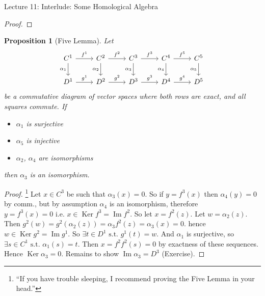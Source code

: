 \documentclass[10pt]{article}
\theoremstyle{plain}
\newtheorem{prop}[thm]{Proposition}
\theoremstyle{definition}
\newcommand{\st}{\text{ s.t. }}
\newcommand{\ie}{\text{ i.e. }}
\DeclareMathOperator{\Ker}{Ker}
\DeclareMathOperator{\Ima}{Im}
\begin{document}
\begin{section}{Lecture 11: Interlude: Some Homological Algebra}
\begin{proof}
\end{proof}
\begin{prop}[Five Lemma]\label{prop:fivelemma} Let
$$%
\begin{tikzcd}
C^1 \arrow[r, "f^1"] \arrow[d, "\alpha_1"'] & C^2 \arrow[r, "f^2"] \arrow[d, "\alpha_2"'] & C^3 \arrow[r, "f^3"] \arrow[d, "\alpha_3"'] & C^4 \arrow[r, "f^5"] \arrow[d, "\alpha_4"'] & C^5 \arrow[d, "\alpha_5"'] \\
D^1 \arrow[r, "g^1"]                        & D^2 \arrow[r, "g^2"]                        & D^3 \arrow[r, "g^3"]                        & D^4 \arrow[r, "g^4"]                        & D^5                       
\end{tikzcd}$$
be a commutative diagram of vector spaces where both rows are exact, and all squares commute. If 
\begin{itemize}
    \item $\alpha_1$ is surjective
    \item $\alpha_5$ is injective
    \item $\alpha_2$, $\alpha_4$ are isomorphisms
\end{itemize} then $\alpha_3$ is an isomorphism.
\end{prop}
\begin{proof}\footnote{``If you have trouble sleeping, I recommend proving the Five Lemma in your head.''} Let $x\in C^3$ be such that $\alpha_3(x) = 0$. So if $y = f^3(x)$ then $\alpha_4(y) = 0$ by comm., but by assumption $\alpha_4$ is an isomorphism, therefore $y = f^3(x) = 0 \ie x \in \Ker f^3 = \Ima f^2$. So let $x = f^2(z)$. Let $w = \alpha_2(z)$. Then $g^2(w) = g^2(\alpha_2(z)) = \alpha_3f^2(z) = \alpha_3(x) = 0.$ hence $w \in \Ker g^2 = \Ima g^1.$ So $\exists t \in D^1 \st g^1(t) =  w.$ And $\alpha_1 $ is surjective, so $\exists s\in C^1 \st \alpha_1(s) = t.$ Then $x = f^2 f^2(s) = 0$ by exactness of these sequences. Hence $\Ker \alpha_3 = 0$. Remains to show $\Ima\alpha_3 = D^3$ (Exercise).
\end{proof}
\end{section}
\end{document}
